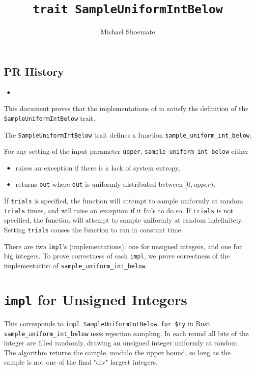 \documentclass{article}
\title{\texttt{trait SampleUniformIntBelow}}
\author{Michael Shoemate}
\begin{document}
\maketitle

\contrib

\subsection*{PR History}
\begin{itemize}
    \item {}
\end{itemize}

This document proves that the implementations of  in  
satisfy the definition of the \texttt{SampleUniformIntBelow} trait.

\begin{definition}
    \label{sample-uniform-int-below}

    The \texttt{SampleUniformIntBelow} trait defines a function \texttt{sample\_uniform\_int\_below}.

    For any setting of the input parameter \texttt{upper},
    \texttt{sample\_uniform\_int\_below} either
    \begin{itemize}
        \item raises an exception if there is a lack of system entropy,
        \item returns \texttt{out} where \texttt{out} is uniformly distributed between $[0, upper)$.
    \end{itemize}

    If \texttt{trials} is specified, the function will attempt to sample uniformly at random \texttt{trials} times,
    and will raise an exception if it fails to do so.
    If \texttt{trials} is not specified, the function will attempt to sample uniformly at random indefinitely.
    Setting \texttt{trials} causes the function to run in constant time.
\end{definition}

There are two \texttt{impl}'s (implementations): one for unsigned integers, and one for big integers.
To prove correctness of each \texttt{impl}, we prove correctness of the implementation of \texttt{sample\_uniform\_int\_below}.

\tableofcontents

\section{\texttt{impl} for Unsigned Integers}
This corresponds to \texttt{impl SampleUniformIntBelow for \$ty} in Rust.
\texttt{sample\_uniform\_int\_below} uses rejection sampling. 
In each round all bits of the integer are filled randomly, drawing an unsigned integer uniformly at random.
The algorithm returns the sample, modulo the upper bound, so long as the sample is not one of the final "div" largest integers.
\end{document}
